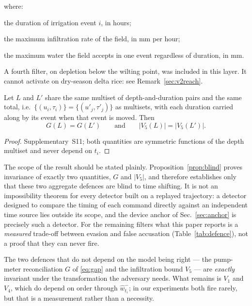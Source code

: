 where:
\begin{symbolist}
\item[$\tau_i$] the duration of irrigation event $i$, in hours;
\item[$k_{\mathrm{inf}}$] the maximum infiltration rate of the field, in mm per hour;
\item[$p_{\max}$] the maximum water the field accepts in one event regardless of
    duration, in mm.
\end{symbolist}

A fourth filter, on depletion below the wilting point, was included in this layer. It cannot activate on dry-season delta rice: see Remark~\ref{sec:v2reach}.

\begin{proposition}
\label{prop:blind}
Let $L$ and $L'$ share the same multiset of depth-and-duration pairs and the same
total, i.e.\ $\{(u_i,\tau_i)\}=\{(u'_j,\tau'_j)\}$ as multisets, with each
duration carried along by its event when that event is moved. Then
\begin{equation}
G(L)=G(L')\qquad\text{and}\qquad |V_5(L)|=|V_5(L')|.
\end{equation}
\end{proposition}

\begin{proof}
Supplementary~S11; both quantities are symmetric functions of the depth
multiset and never depend on $t_i$.
\end{proof}

The scope of the result should be stated plainly. Proposition~\ref{prop:blind}
proves invariance of exactly two quantities, $G$ and $|V_5|$, and therefore establishes
only that these two aggregate defences are blind to time shifting. It is not an
impossibility theorem for every detector built on a replayed trajectory: a detector
designed to compare the timing of each command directly against an independent time
source lies outside its scope, and the device anchor of Sec.~\ref{sec:anchor} is
precisely such a detector. For the remaining filters what this paper reports is a
\emph{measured} trade-off between evasion and false accusation
(Table~\ref{tab:defence}), not a proof that they can never fire.

The two defences that do not depend on the model being right --- the pump-meter
reconciliation $G$ of \eqref{eq:gap} and the infiltration bound $V_5$ --- are
\emph{exactly} invariant under the transformation the adversary needs. What remains is
$V_1$ and $V_4$, which do depend on order through $\hat w_{t_i}^{-}$; in our
experiments both fire rarely, but that is a measurement rather than a necessity.

